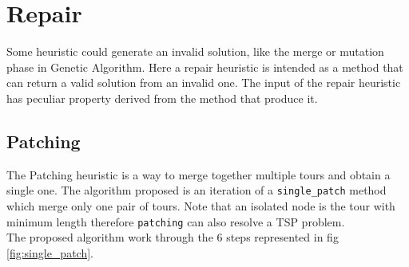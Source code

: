 \chapter{Repair}
Some heuristic could generate an invalid solution, like the merge or mutation phase in Genetic Algorithm. Here a repair heuristic is intended as a method that can return a valid solution from an invalid one. The input of the repair heuristic has peculiar property derived from the method that produce it.
\section{Patching} \label{section:patching}
The Patching heuristic is a way to merge together multiple tours and obtain a single one.
The algorithm proposed is an iteration of a \texttt{single\_patch} method which merge only one pair of tours. Note that an isolated node is the tour with minimum length therefore \texttt{patching} can also resolve a TSP problem. \\
The proposed algorithm work through the 6 steps represented in fig \ref{fig:single_patch}.
